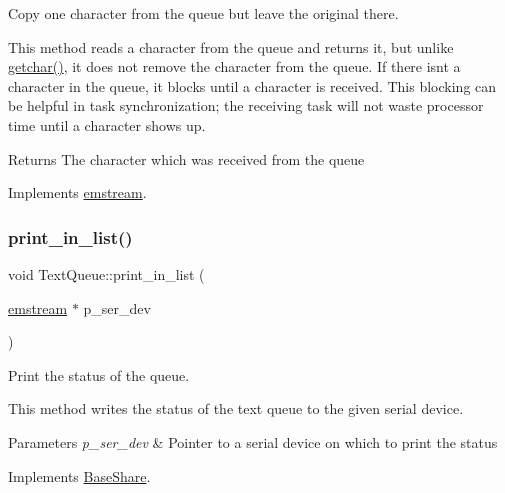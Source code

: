 Copy one character from the queue but leave the original there. 

This method reads a character from the queue and returns it, but unlike {\ttfamily \mbox{\hyperlink{class_text_queue_ab682ee4d2cbad87e9496ca424fa03b0a}{getchar()}}}, it does not remove the character from the queue. If there isn\textquotesingle{}t a character in the queue, it blocks until a character is received. This blocking can be helpful in task synchronization; the receiving task will not waste processor time until a character shows up. \begin{DoxyReturn}{Returns}
The character which was received from the queue 
\end{DoxyReturn}


Implements \mbox{\hyperlink{classemstream}{emstream}}.

\mbox{\label{class_text_queue_aeef41a1bc3486d98fb31cba9ce539d0d}} 
\subsubsection{\texorpdfstring{print\+\_\+in\+\_\+list()}{print\_in\_list()}}
{\footnotesize\ttfamily void Text\+Queue\+::print\+\_\+in\+\_\+list (\begin{DoxyParamCaption}\item[{\mbox{\hyperlink{classemstream}{emstream}} $\ast$}]{p\+\_\+ser\+\_\+dev }\end{DoxyParamCaption})\hspace{0.3cm}{\ttfamily [virtual]}}



Print the status of the queue. 

This method writes the status of the text queue to the given serial device. 
\begin{DoxyParams}{Parameters}
{\em p\+\_\+ser\+\_\+dev} & Pointer to a serial device on which to print the status \\
\hline
\end{DoxyParams}


Implements \mbox{\hyperlink{class_base_share_a81ef685c8c1897ee316e853103e9941a}{Base\+Share}}.

\mbox{\label{class_text_queue_a917e1c134d4ef6591f832e2706a67cac}} 
